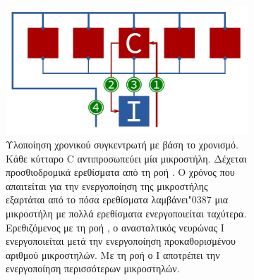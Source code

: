 	\begin{figure}[t]
		\centering
		\hfill
		\begin{subfigure}[t]{0.45\textwidth}
			\centering
			\includegraphics[width=\textwidth]{figures/spatial_hardware}
			\caption[κυκλωματική υλοποίηση χωρικού συγκεντρωτή]{Υλοποίηση χρονικού συγκεντρωτή με βάση το χρονισμό.
			Κάθε κύτταρο C αντιπροσωπεύει μία μικροστήλη. Δέχεται προσθιοδρομικά ερεθίσματα από τη ροή .
			Ο χρόνος που απαιτείται για την ενεργοποίηση της μικροστήλης εξαρτάται από το πόσα ερεθίσματα λαμβάνει\char"0387 μια μικροστήλη με πολλά ερεθίσματα ενεργοποιείται ταχύτερα.
			Ερεθιζόμενος με τη ροή , ο ανασταλτικός νευρώνας I ενεργοποιείται μετά την ενεργοποίηση προκαθορισμένου αριθμού μικροστηλών.
			Με τη ροή  ο I αποτρέπει την ενεργοποίηση περισσότερων μικροστηλών.
			}
			\label{fig:SP_circ}
		\end{subfigure}
		\hfill
		\begin{subfigure}[t]{0.40\textwidth}
			\centering

\end{subfigure}
\end{figure}
